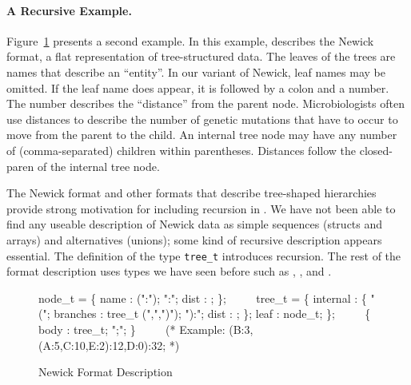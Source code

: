\paragraph*{A Recursive \ipads{} Example.}
Figure~\ref{fig:ipads-newick} presents a second \ipads{} example.
In this example, \ipads{} describes the Newick format, a flat
representation of tree-structured data.  The leaves of the trees
are names that describe an ``entity''.   In our variant of Newick, 
leaf names may be omitted.  If the leaf name does appear,
it is followed by a colon and a number.  The number describes the ``distance''
from the parent node.  Microbiologists often use
distances to describe the
number of genetic mutations that have to occur to move from the parent 
to the child.  An internal tree node may have any number of (comma-separated)
children within parentheses.  Distances follow the closed-paren
of the internal tree node.

The Newick format and other formats that describe tree-shaped 
hierarchies~\cite{geneontology,newick}
provide strong motivation for including recursion in \ipads.  
We have not been able to find any useable description of Newick data as
simple sequences (structs and arrays) and alternatives (unions); some
kind of recursive description appears essential.
The definition of the type {\tt tree\_t} introduces recursion.
The rest of the format description uses types we have seen before such as
\Pstruct, \Parray{}, and \Punion.


\begin{figure}
{\small
\begin{code}
node\_t = \Popt \Pstruct \{
                name : \Pstring(":"); ":";
                dist : \Puint;  
              \};
\(\qquad\)
\Prec tree\_t = \Punion \{
    internal : \Pstruct \{
        "(";  branches : tree\_t \Parray(",",")");
        "):"; dist : \Puint;
      \};
    leaf : node\_t;
  \};
\(\qquad\)
\Pstruct \{
  body : tree\_t; ";";
\}
\(\qquad\)
(* Example: (B:3,(A:5,C:10,E:2):12,D:0):32; *)
\end{code}
\caption{\ipads{} Newick Format Description}
\label{fig:ipads-newick}
}
\end{figure}

